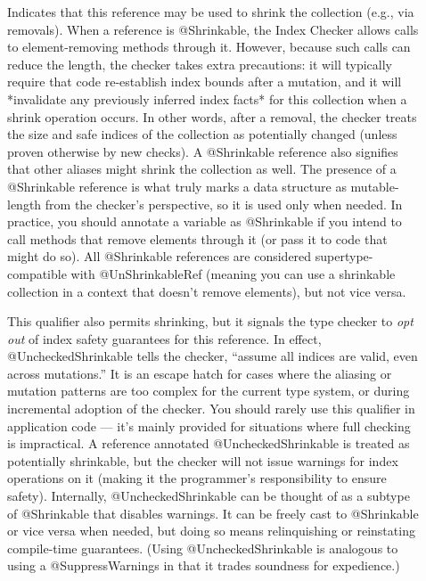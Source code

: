 \begin{description}
\item[]
  Indicates that this reference may be used to shrink the collection (e.g., via removals).
  When a reference is @Shrinkable, the Index Checker allows calls to element-removing methods
  through it. However, because such calls can reduce the length, the checker takes extra
  precautions: it will typically require that code re-establish index bounds after a mutation,
  and it will *invalidate any previously inferred index facts* for this collection when a shrink
  operation occurs. In other words, after a removal, the checker treats the size and safe indices
  of the collection as potentially changed (unless proven otherwise by new checks). A @Shrinkable reference also signifies that other aliases might shrink the collection as well. The presence of a @Shrinkable reference is what truly marks a data structure as mutable-length from the checker’s perspective, so it is used only when needed. In practice, you should annotate a variable as @Shrinkable if you intend to call methods that remove elements through it (or pass it to code that might do so). All @Shrinkable references are considered supertype-compatible with @UnShrinkableRef (meaning you can use a shrinkable collection in a context that doesn’t remove elements), but not vice versa.

\item[]
  This qualifier also permits shrinking, but it signals the type checker to \emph{opt out} of
  index safety guarantees for this reference. In effect, @UncheckedShrinkable tells the checker,
  “assume all indices are valid, even across mutations.” It is an escape hatch for cases where
  the aliasing or mutation patterns are too complex for the current type system, or during
  incremental adoption of the checker. You should rarely use this qualifier in application code —
  it’s mainly provided for situations where full checking is impractical. A reference annotated
  @UncheckedShrinkable is treated as potentially shrinkable, but the checker will not issue
  warnings for index operations on it (making it the programmer’s responsibility to ensure safety).
  Internally, @UncheckedShrinkable can be thought of as a subtype of @Shrinkable that disables
  warnings. It can be freely cast to @Shrinkable or vice versa when needed, but doing so means
  relinquishing or reinstating compile-time guarantees.  (Using @UncheckedShrinkable is analogous
  to using a @SuppressWarnings in that it trades soundness for expedience.)


\end{description}
